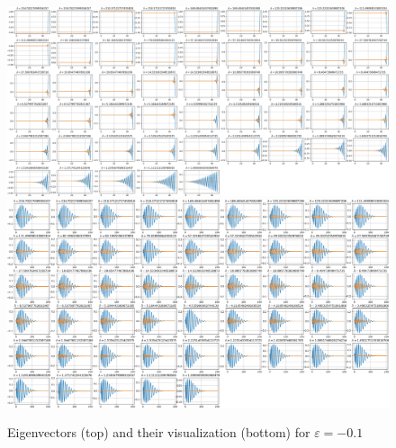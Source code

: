 \documentclass{article}
\begin{document}
\begin{figure}[H]
\centering
\includegraphics[width=1.2\textwidth]{dat/projection_neg_eigs.png}
\includegraphics[width=1.2\textwidth]{dat/projection_neg_eigs_visual.png}
\caption{Eigenvectors (top) and their visualization (bottom) for $\varepsilon = -0.1$}
\end{figure}
\end{document}
